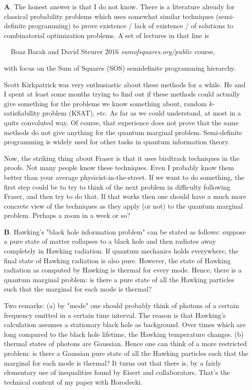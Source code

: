 \begin{description}
\textbf{A}. The honest answer is that I do not know. There is a literature already for
classical probability problems which uses somewhat similar techniques
(semi-definite programming) to prove existence / lack of existence / of
solutions to combinatorial optimization problems. A set of lectures in that line
is

  Boaz Barak and David Steurer 2016 %
  {{\em sumofsquares.org/public}} course, 

with focus on the Sum of Squares (SOS) semidefinite programming hierarchy.

Scott Kirkpatrick was very enthusiastic about these methods for a while. He
and I spent at least some months trying to find out if these methods could
actually give something for the problems we know something about, random
$k$-satisfiability problem (KSAT),
etc. As far as we could understand, at most in a quite convoluted way. Of
course, that experience does not prove that the same methods do not give
anything for the quantum marginal problem. Semi-definite programming is
widely used for other tasks in quantum information theory.

Now, the striking thing about Fraser is that it uses birdtrack
techniques in the proofs. Not many people know these techniques. Even I
probably know them better than your average physicist-in-the-street. If we
want to do something, the first step could be to try to think of the next
problem in difficulty following Fraser, and then try to do that. If that
works then one should have a much more concrete view of the techniques as
they apply (or not) to the quantum marginal problem. Perhaps a zoom in a week
or so? 

\medskip

\textbf{B}. Hawking's "black hole information problem" can be stated as follows:
suppose a pure state of matter collapses to a black hole and then radiates
away completely in Hawking radiation. If quantum mechanics holds everywhere,
the final state of Hawking radiation is also pure. However, the state of
Hawking radiation as computed by Hawking is thermal for every mode. Hence,
there is a quantum marginal problem: is there a pure state of all the Hawking
particles such that the marginal for each mode is thermal?

Two remarks: (a) by "mode" one should probably think of photons of a certain
frequency emitted in a certain time interval. The reason is that Hawking's
calculation assumes a stationary black hole as background. Over times which
are long compared to the black hole lifetime, the Hawking temperature
changes. (b) thermal states of photons are Gaussian. Hence one can think of a
more restricted problem: is there a Gaussian pure state of all the Hawking
particles such that the marginal for each mode is thermal? It turns out that
there is, by a fairly elementary use of inequalities found by Eisert and
collaborators. That's the technical content of my paper with
Horodecki.


\end{description}
